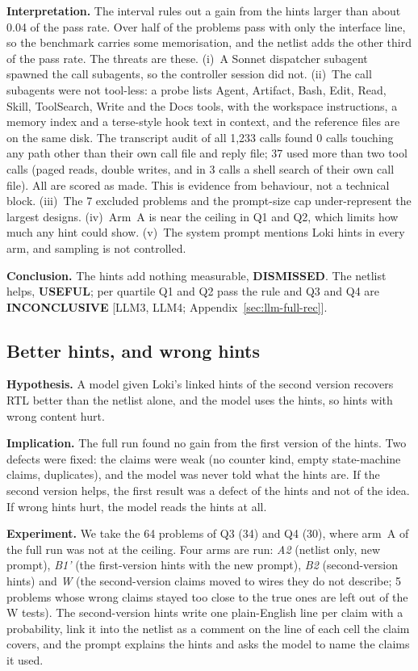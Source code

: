 \documentclass[conference]{IEEEtran}
\newcommand{\verdict}[1]{\textbf{\textsc{#1}}}
\newcommand{\hev}[1]{\par\smallskip\noindent\textbf{#1}}
\begin{document}
\hev{Interpretation.} The interval rules out a gain from the hints larger than about 0.04 of the pass rate. Over half of the problems pass with only the interface line, so the benchmark carries some memorisation, and the netlist adds the other third of the pass rate. The threats are these. (i)~A Sonnet dispatcher subagent spawned the call subagents, so the controller session did not. (ii)~The call subagents were not tool-less: a probe lists Agent, Artifact, Bash, Edit, Read, Skill, ToolSearch, Write and the Docs tools, with the workspace instructions, a memory index and a terse-style hook text in context, and the reference files are on the same disk. The transcript audit of all 1,233 calls found 0 calls touching any path other than their own call file and reply file; 37 used more than two tool calls (paged reads, double writes, and in 3 calls a shell search of their own call file). All are scored as made. This is evidence from behaviour, not a technical block. (iii)~The 7 excluded problems and the prompt-size cap under-represent the largest designs. (iv)~Arm~A is near the ceiling in Q1 and Q2, which limits how much any hint could show. (v)~The system prompt mentions Loki hints in every arm, and sampling is not controlled.

\hev{Conclusion.} The hints add nothing measurable, \verdict{DISMISSED}. The netlist helps, \verdict{USEFUL}; per quartile Q1 and Q2 pass the rule and Q3 and Q4 are \verdict{INCONCLUSIVE} [LLM3, LLM4; Appendix~\ref{sec:llm-full-rec}].

\subsection{Better hints, and wrong hints}
\label{arg:la3}
\label{sec:llm-hints2}

\hev{Hypothesis.} A model given Loki's linked hints of the second version recovers RTL better than the netlist alone, and the model uses the hints, so hints with wrong content hurt.

\hev{Implication.} The full run found no gain from the first version of the hints. Two defects were fixed: the claims were weak (no counter kind, empty state-machine claims, duplicates), and the model was never told what the hints are. If the second version helps, the first result was a defect of the hints and not of the idea. If wrong hints hurt, the model reads the hints at all.

\hev{Experiment.} We take the 64 problems of Q3 (34) and Q4 (30), where arm~A of the full run was not at the ceiling. Four arms are run: \emph{A2} (netlist only, new prompt), \emph{B1'} (the first-version hints with the new prompt), \emph{B2} (second-version hints) and \emph{W} (the second-version claims moved to wires they do not describe; 5 problems whose wrong claims stayed too close to the true ones are left out of the W tests). The second-version hints write one plain-English line per claim with a probability, link it into the netlist as a comment on the line of each cell the claim covers, and the prompt explains the hints and asks the model to name the claims it used.
\end{document}
